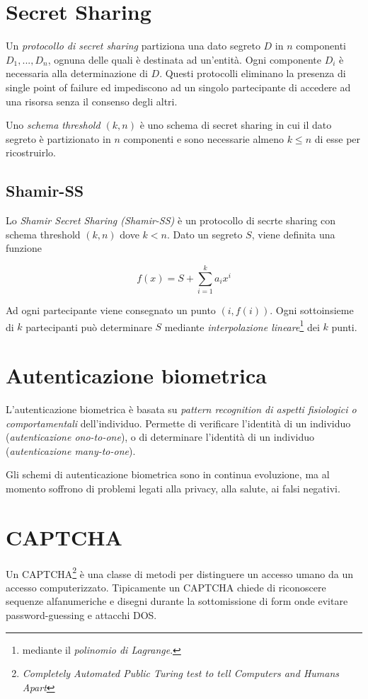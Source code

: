 \section{Secret Sharing}
Un \textit{protocollo di secret sharing} partiziona una dato segreto $D$ in $n$ componenti $D_{1},...,D_{n}$, ognuna delle quali è destinata ad un'entità.
Ogni componente $D_{i}$ è necessaria alla determinazione di $D$.
Questi protocolli eliminano la presenza di single point of failure ed impediscono ad un singolo partecipante di accedere ad una risorsa senza il consenso degli altri.

Uno \textit{schema threshold $(k,n)$} è uno schema di secret sharing in cui il dato segreto è partizionato in $n$ componenti e sono necessarie almeno $k\leq n$ di esse per ricostruirlo.


\subsection{Shamir-SS}
Lo \textit{Shamir Secret Sharing (Shamir-SS)} è un protocollo di secrte sharing con schema threshold $(k,n)$ dove $k<n$.
Dato un segreto $S$, viene definita una funzione

\begin{equation}
  f(x)=S+\sum_{i=1}^{k}a_{i}x^{i}
\end{equation}

Ad ogni partecipante viene consegnato un punto $(i,f(i))$.
Ogni sottoinsieme di $k$ partecipanti può determinare $S$ mediante \textit{interpolazione lineare}\footnote{mediante il \textit{polinomio di Lagrange}.} dei $k$ punti.


\section{Autenticazione biometrica}
L'autenticazione biometrica è basata su \textit{pattern recognition di aspetti fisiologici o comportamentali} dell'individuo.
Permette di verificare l'identità di un individuo (\textit{autenticazione ono-to-one}), o di determinare l'identità di un individuo (\textit{autenticazione many-to-one}).

Gli schemi di autenticazione biometrica sono in continua evoluzione, ma al momento soffrono di problemi legati alla privacy, alla salute, ai falsi negativi.


\section{CAPTCHA}
Un CAPTCHA\footnote{\textit{Completely Automated Public Turing test to tell Computers and Humans Apart}} è una classe di metodi per distinguere un accesso umano da un accesso computerizzato.
Tipicamente un CAPTCHA chiede di riconoscere sequenze alfanumeriche e disegni durante la sottomissione di form onde evitare password-guessing e attacchi DOS.


